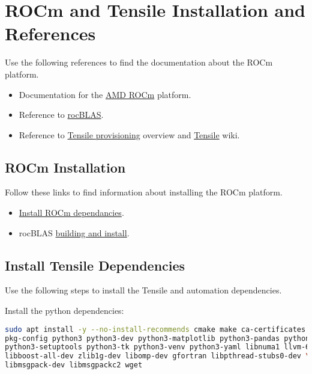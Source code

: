 \documentclass[]{article}
\begin{document}
\appendix
\section{ROCm and Tensile Installation and References}
\label{sec:appendixA}

Use the following references to find the documentation about the ROCm platform.
\begin{itemize}
	\item Documentation for the \href{https://rocmdocs.amd.com/en/latest/}{AMD ROCm} platform.
	\item Reference to \href{https://rocblas.readthedocs.io/en/latest/intro.html}{rocBLAS}.
	\item Reference to \href{https://github.com/ROCmSoftwarePlatform/Tensile/tree/develop/tuning}{Tensile provisioning} overview and \href{https://github.com/ROCmSoftwarePlatform/Tensile/wiki}{Tensile} wiki.
\end{itemize}

\subsection{ROCm Installation}

Follow these links to find information about installing the ROCm platform. \newline

\begin{itemize}
	\item \href{https://rocmdocs.amd.com/en/latest/Installation_Guide/Installation-Guide.html}{Install ROCm dependancies}.
	\item rocBLAS \href{https://rocblas.readthedocs.io/en/latest/install.html}{building and install}.
\end{itemize}

\subsection{Install Tensile Dependencies}
\label{sec:dependencies}

Use the following steps to install the Tensile and automation dependencies. \newline

\noindent Install the python dependencies:

\begin{lstlisting}[language=bash,breaklines=true]
sudo apt install -y --no-install-recommends cmake make ca-certificates git \
pkg-config python3 python3-dev python3-matplotlib python3-pandas python3-pip \
python3-setuptools python3-tk python3-venv python3-yaml libnuma1 llvm-6.0-dev \
libboost-all-dev zlib1g-dev libomp-dev gfortran libpthread-stubs0-dev \
libmsgpack-dev libmsgpackc2 wget
\end{lstlisting}
\end{document}
